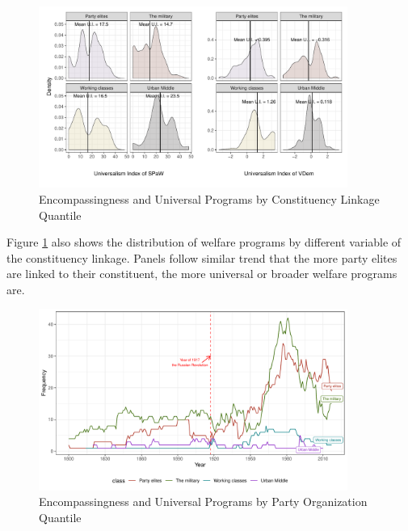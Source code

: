 \documentclass[12pt]{article}
\begin{document}
\begin{figure}[!ht]
	\centering
	\includegraphics[width=0.9\textwidth]{"../3. Datasets_Codebooks/Figures/Plot2"}
	\caption{Encompassingness and Universal Programs by Constituency Linkage Quantile}
	\label{fig:figure2}
\end{figure}

Figure \ref{fig:figure2} also shows the distribution of welfare programs by different variable of the constituency linkage. Panels follow similar trend that the more party elites are linked to their constituent, the more universal or broader welfare programs are.\par

\begin{figure}[!ht]
	\centering
	\includegraphics[width=0.9\textwidth]{"../3. Datasets_Codebooks/Figures/Plot3"}
	\caption{Encompassingness and Universal Programs by Party Organization Quantile}
	\label{fig:figure3}
\end{figure}
\end{document}
